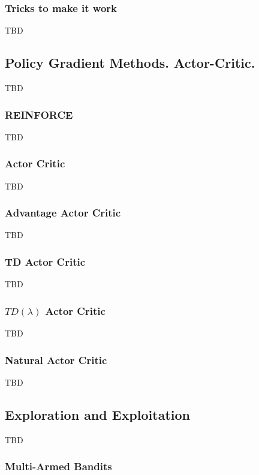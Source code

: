\documentclass{article}
\begin{document}
\subsubsection{Tricks to make it work}

TBD

\subsection{Policy Gradient Methods. Actor-Critic.}

TBD

\subsubsection{REINFORCE}

TBD

\subsubsection{Actor Critic}

TBD

\subsubsection{Advantage Actor Critic}

TBD

\subsubsection{TD Actor Critic}

TBD

\subsubsection{$TD(\lambda)$ Actor Critic}

TBD

\subsubsection{Natural Actor Critic}

TBD

\subsection{Exploration and Exploitation}

TBD

\subsubsection{Multi-Armed Bandits}
\end{document}
